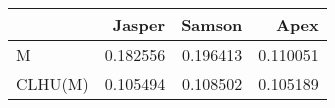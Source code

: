 \begin{tabular}{lrrr}
\toprule
{} &    Jasper &    Samson &      Apex \\
\midrule
M       &  0.182556 &  0.196413 &  0.110051 \\
CLHU(M) &  0.105494 &  0.108502 &  0.105189 \\
\bottomrule
\end{tabular}
